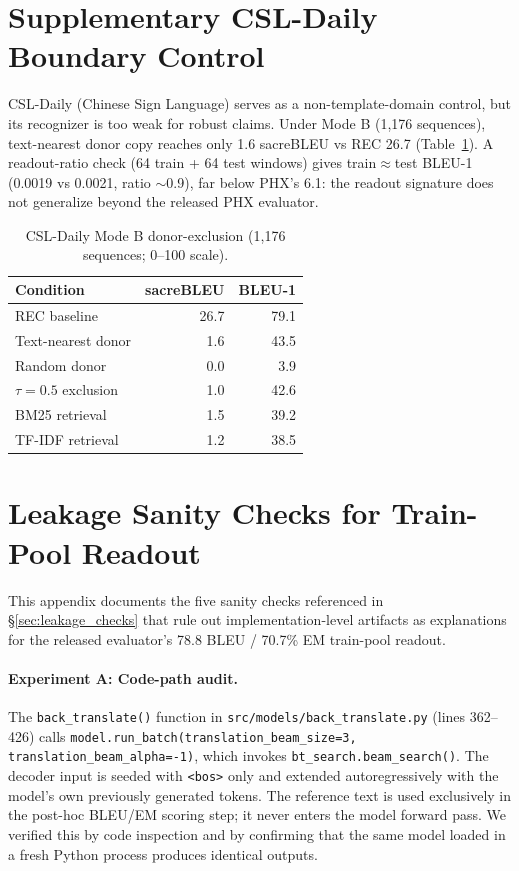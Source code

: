 \documentclass[pdflatex,sn-chicago]{sn-jnl}
\begin{document}
\section{Supplementary CSL-Daily Boundary Control}
\label{sec:csl-daily}
CSL-Daily (Chinese Sign Language) serves as a non-template-domain control, but its recognizer is too weak for robust claims. Under Mode B (1{,}176 sequences), text-nearest donor copy reaches only 1.6 sacreBLEU vs REC 26.7 (Table~\ref{tab:csl_donor_exclusion}). A readout-ratio check (64 train + 64 test windows) gives train$\approx$test BLEU-1 (0.0019 vs 0.0021, ratio $\sim$0.9), far below PHX's 6.1: the readout signature does not generalize beyond the released PHX evaluator.

\begin{table}[h]
\centering
\small
\caption{CSL-Daily Mode B donor-exclusion (1{,}176 sequences; 0--100 scale).}
\label{tab:csl_donor_exclusion}
\begin{tabular}{lrr}
\toprule
Condition & sacreBLEU & BLEU-1 \\
\midrule
REC baseline & 26.7 & 79.1 \\
Text-nearest donor & 1.6 & 43.5 \\
Random donor & 0.0 & 3.9 \\
$\tau{=}0.5$ exclusion & 1.0 & 42.6 \\
BM25 retrieval & 1.5 & 39.2 \\
TF-IDF retrieval & 1.2 & 38.5 \\
\bottomrule
\end{tabular}
\end{table}

\section{Leakage Sanity Checks for Train-Pool Readout}
\label{sec:appendix_leakage}
This appendix documents the five sanity checks referenced in \S\ref{sec:leakage_checks} that rule out implementation-level artifacts as explanations for the released evaluator's 78.8 BLEU / 70.7\% EM train-pool readout.

\paragraph{Experiment A: Code-path audit.}
The \texttt{back\_translate()} function in \texttt{src/models/back\_translate.py} (lines 362--426) calls \texttt{model.run\_batch(translation\_beam\_size=3, translation\_beam\_alpha=-1)}, which invokes \texttt{bt\_search.beam\_search()}. The decoder input is seeded with \texttt{<bos>} only and extended autoregressively with the model's own previously generated tokens. The reference text is used exclusively in the post-hoc BLEU/EM scoring step; it never enters the model forward pass. We verified this by code inspection and by confirming that the same model loaded in a fresh Python process produces identical outputs.
\end{document}
